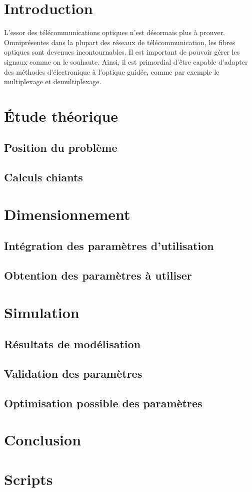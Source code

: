 \documentclass[a4paper,11pt]{report}
\begin{document}


\chapter*{Introduction}

L'essor des télécommunications optiques n'est désormais plus à prouver. Omniprésentes dans la plupart des réseaux de télécommunication, les fibres optiques sont devenues incontournables. Il est important de pouvoir gérer les signaux comme on le souhaute. Ainsi, il est primordial d'être capable d'adapter des méthodes d'électronique à l'optique guidée, comme par exemple le multiplexage et demultiplexage. 

\chapter{Étude théorique}

\section{Position du problème}

\section{Calculs chiants}

\chapter{Dimensionnement}
\section{Intégration des paramètres d'utilisation}
\section{Obtention des paramètres à utiliser}
\chapter{Simulation}
\section{Résultats de modélisation}
\section{Validation des paramètres}
\section{Optimisation possible des paramètres}
\chapter*{Conclusion}

\appendix
\chapter{Scripts}
\end{document}
